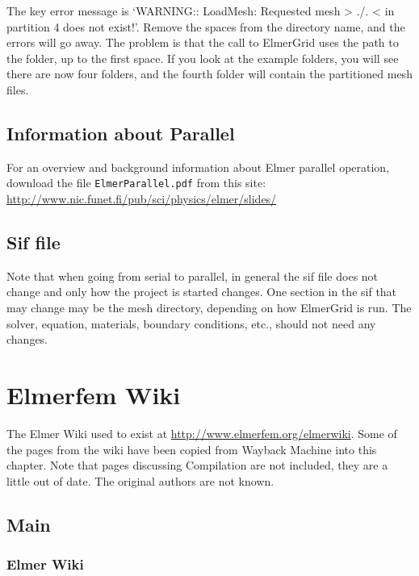  The key error message is `WARNING:: LoadMesh: Requested mesh > ./. < in partition 4 does not exist!'.  Remove the spaces from the directory name, and the errors will go away.  The problem is that the call to ElmerGrid uses the path to the folder, up to the first space.  If you look at the example folders, you will see there are now four folders, and the fourth folder will contain the partitioned mesh files.


\section{Information about Parallel}

For an overview and background information about Elmer parallel operation, download the file \texttt{ElmerParallel.pdf} from this site:\\

\url{http://www.nic.funet.fi/pub/sci/physics/elmer/slides/}


\section{Sif file}

Note that when going from serial to parallel, in general the sif file does not change and only how the project is started changes.  One section in the sif that may change may be the mesh directory, depending on how ElmerGrid is run.  The solver, equation, materials, boundary conditions, etc., should not need any changes.



\chapter{Elmerfem Wiki}

The Elmer Wiki used to exist at \url{http://www.elmerfem.org/elmerwiki}.  Some of the pages from the wiki have been copied from Wayback Machine into this chapter. Note that pages discussing Compilation are not included, they are a little out of date.  The original authors are not known.

\section{Main}

\subsection{Elmer Wiki}

